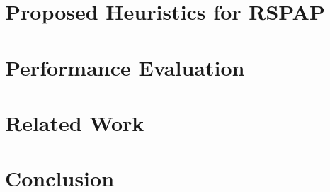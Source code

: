 \documentclass[journal,cspaper,compsoc]{IEEEtran}
\begin{document}
\section{Proposed Heuristics for RSPAP}\label{sec:heuristics}


\section{Performance Evaluation}\label{sec:evaluation}

\section{Related Work}\label{sec:related}


\section{Conclusion}\label{sec:conclusion}



\end{document}
